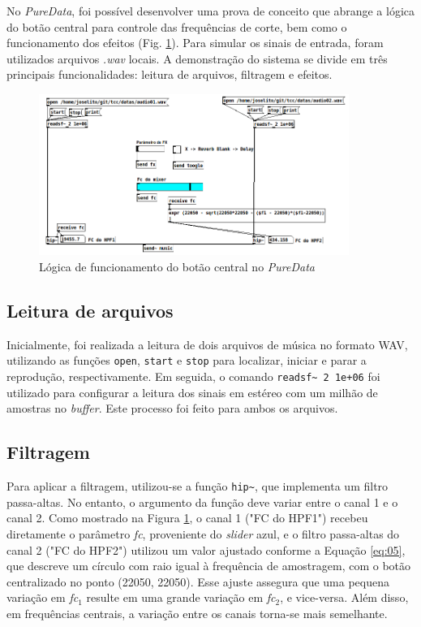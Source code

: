 No \textit{PureData}, foi possível desenvolver uma prova de conceito que abrange a lógica do botão central para controle das frequências de corte, bem como o funcionamento dos efeitos (Fig. \ref{fig44}). Para simular os sinais de entrada, foram utilizados arquivos \textit{.wav} locais. A demonstração do sistema se divide em três principais funcionalidades: leitura de arquivos, filtragem e efeitos.

\begin{figure}[h]
    \centering
    \includegraphics[width=0.9\textwidth]{figuras/fig44.png}
    \caption{Lógica de funcionamento do botão central no \textit{PureData}}
    \label{fig44}
\end{figure}

\subsection{Leitura de arquivos}

Inicialmente, foi realizada a leitura de dois arquivos de música no formato WAV, utilizando as funções \texttt{open}, \texttt{start} e \texttt{stop} para localizar, iniciar e parar a reprodução, respectivamente. Em seguida, o comando \texttt{readsf\textasciitilde\ 2 1e+06} foi utilizado para configurar a leitura dos sinais em estéreo com um milhão de amostras no \textit{buffer}. Este processo foi feito para ambos os arquivos.

\subsection{Filtragem}


Para aplicar a filtragem, utilizou-se a função \texttt{hip\textasciitilde}, que implementa um filtro passa-altas. No entanto, o argumento da função deve variar entre o canal 1 e o canal 2. Como mostrado na Figura \ref{fig44}, o canal 1 ("FC do HPF1") recebeu diretamente o parâmetro \textit{fc}, proveniente do \textit{slider} azul, e o filtro passa-altas do canal 2 ("FC do HPF2") utilizou um valor ajustado %
conforme a Equação \ref{eq:05}, que descreve um círculo com raio igual à frequência de amostragem, com o botão centralizado no ponto (22050, 22050). Esse ajuste assegura que uma pequena variação em \textit{fc$_{1}$} resulte em uma grande variação em \textit{fc$_{2}$}, e vice-versa. Além disso, em frequências centrais, a variação entre os canais torna-se mais semelhante. %

